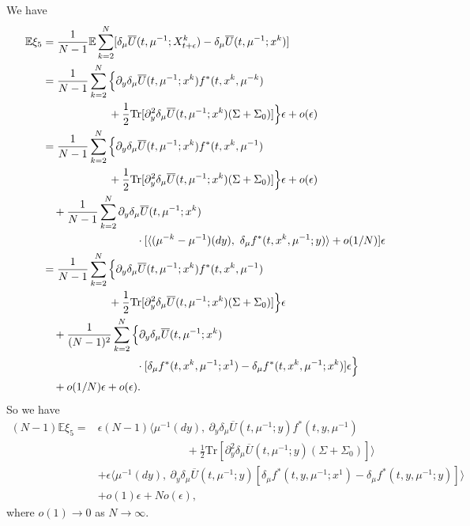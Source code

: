 \documentclass{amsart}
\theoremstyle{definition}
\theoremstyle{remark}
\def\EE{{\mathbb E}}
\numberwithin{equation}{section}
\begin{document}
We have {\allowdisplaybreaks
\begin{align*}
\EE\xi_5 & = \frac{1}{N-1}\EE\sum_{k=2}^N
[\delta_\mu \overline U(t, \mu^{-1}; X^k_{t+\epsilon})-\delta_\mu \overline U(t, \mu^{-1}; x^k)] \\
&= \frac{1}{N-1}\sum_{k=2}^N
\Big\{\partial_y\delta_\mu \overline U(t, \mu^{-1}; x^k) f^*(t, x^k, \mu^{-k})\\ & \qquad \qquad \qquad +\frac12 \mbox{Tr} [\partial_{y}^2\delta_\mu \overline U(t, \mu^{-1}; x^k)(\Sigma+\Sigma_0) ]\Big\}\epsilon +o(\epsilon)\\
&= \frac{1}{N-1}\sum_{k=2}^N
\Big\{\partial_y\delta_\mu \overline U(t, \mu^{-1}; x^k) f^*(t, x^k, \mu^{-1}) \\
&\qquad \qquad \qquad   +\frac12 \mbox{Tr} [\partial_{y}^2\delta_\mu \overline U(t, \mu^{-1}; x^k)(\Sigma+\Sigma_0) ]\Big\}\epsilon +o(\epsilon)\\
&\quad +  \frac{1}{N-1}\sum_{k=2}^N \partial_y\delta_\mu \overline U(t, \mu^{-1}; x^k)\\
&\hskip 3cm\cdot [\langle (\mu^{-k}-\mu^{-1})(dy),\  \delta_\mu f^*(t, x^k, \mu^{-1}; y) \rangle + o(1/N)]\epsilon \\
&=\frac{1}{N-1}\sum_{k=2}^N
\Big\{\partial_y\delta_\mu \overline U(t, \mu^{-1}; x^k) f^*(t, x^k, \mu^{-1}) \\
&\qquad \qquad \qquad    +\frac12 \mbox{Tr}[\partial_{y}^2\delta_\mu \overline U(t, \mu^{-1}; x^k)(\Sigma+\Sigma_0) ]\Big\}\epsilon \\
&\quad +  \frac{1}{(N-1)^2}\sum_{k=2}^N\Big\{ \partial_y\delta_\mu \overline U(t, \mu^{-1}; x^k)\\
& \hskip 3cm \cdot  [  \delta_\mu f^*(t, x^k, \mu^{-1}; x^1)- \delta_\mu f^*(t, x^k, \mu^{-1}; x^k) ]\epsilon \Big\}\\
&\quad   + o(1/N)\epsilon+o(\epsilon).
\end{align*}
}
So we have
\begin{align*}
(N-1) \EE \xi_5= & \epsilon (N-1)
\Big\langle \mu^{-1}(dy), \ \partial_y\delta_\mu \overline U(t, \mu^{-1}; y) f^*(t, y, \mu^{-1})\\
&\qquad\qquad \qquad\qquad +\frac12 \mbox{Tr}[\partial_{y}^2\delta_\mu \overline U(t, \mu^{-1}; y)(\Sigma+\Sigma_0) ] \Big \rangle \\
&+\epsilon \langle \mu^{-1}(dy),\   \partial_y\delta_\mu \overline U(t, \mu^{-1}; y)[  \delta_\mu f^*(t, y, \mu^{-1}; x^1)- \delta_\mu f^*(t, y, \mu^{-1}; y) ]  \rangle \\
&  + o(1) \epsilon+  N o(\epsilon),
\end{align*}
where $o(1)\to 0$ as $N\to \infty$.
\end{document}
